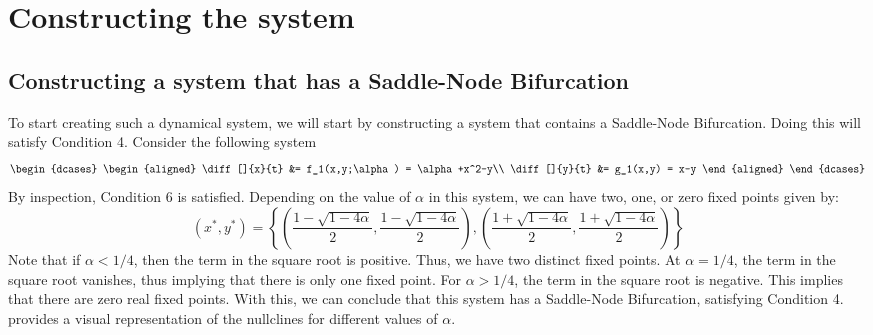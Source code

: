 \section{Constructing the system}\label{sec:constructing-the-system}

\subsection{Constructing a system that has a Saddle-Node Bifurcation}\label{subsec:constructing-a-system-that-has-a-saddle-node-bifurcation}
To start creating such a dynamical system, we will start by constructing a system that contains a Saddle-Node Bifurcation. Doing this will satisfy Condition 4. Consider the following system
\begin{equation*}
    \begin{dcases}
        \begin{aligned}
            \diff[]{x}{t} &= f_1(x,y;\alpha) = \alpha+x^2-y\\
            \diff[]{y}{t} &= g_1(x,y) = x-y
        \end{aligned}
    \end{dcases}
\end{equation*}
By inspection, Condition 6 is satisfied. Depending on the value of $\alpha$ in this system, we can have two, one, or zero fixed points given by:
\begin{equation*}
    \left(x^*,y^*\right) = \left\{\left(\frac{1-\sqrt{1-4\alpha}}{2}, \frac{1-\sqrt{1-4\alpha}}{2}\right), \left(\frac{1+\sqrt{1-4\alpha}}{2}, \frac{1+\sqrt{1-4\alpha}}{2}\right)\right\}
\end{equation*}
Note that if $\alpha<1/4$, then the term in the square root is positive. Thus, we have two distinct fixed points. At $\alpha=1/4$, the term in the square root vanishes, thus implying that there is only one fixed point. For $\alpha>1/4$, the term in the square root is negative. This implies that there are zero real fixed points. With this, we can conclude that this system has a Saddle-Node Bifurcation, satisfying Condition 4.  provides a visual representation of the nullclines for different values of $\alpha$.

